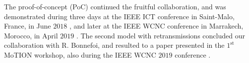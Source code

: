The proof-of-concept (PoC) continued the fruitful collaboration, and was demonstrated during three days at the IEEE ICT conference in Saint-Malo, France, in June $2018$ \cite{Besson2018ICT}, and later at the IEEE WCNC conference in Marrakech, Morocco, in April $2019$ \cite{Besson2019WCNC}.
%
The second model with retransmissions concluded our collaboration with R. Bonnefoi, and resulted to a paper presented in the $1^{\text{st}}$ MoTION workshop, also during the IEEE WCNC $2019$ conference \cite{Bonnefoi2019WCNC}.


